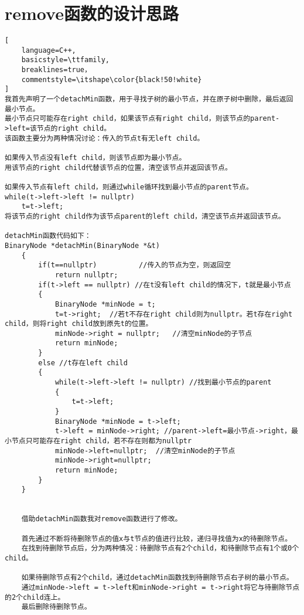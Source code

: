 \documentclass[UTF8]{ctexart}
\begin{document}
\pagestyle{fancy}
\fancyhead{}

\section{remove函数的设计思路}
\begin{lstlisting}[
    language=C++,
    basicstyle=\ttfamily,
    breaklines=true，
    commentstyle=\itshape\color{black!50!white}
]
我首先声明了一个detachMin函数，用于寻找子树的最小节点，并在原子树中删除，最后返回最小节点。
最小节点只可能存在right child，如果该节点有right child，则该节点的parent->left=该节点的right child。
该函数主要分为两种情况讨论：传入的节点t有无left child。

如果传入节点没有left child，则该节点即为最小节点。
用该节点的right child代替该节点的位置，清空该节点并返回该节点。

如果传入节点有left child，则通过while循环找到最小节点的parent节点。
while(t->left->left != nullptr) 
    t=t->left;
将该节点的right child作为该节点parent的left child，清空该节点并返回该节点。

detachMin函数代码如下：
BinaryNode *detachMin(BinaryNode *&t)
    {
        if(t==nullptr)          //传入的节点为空，则返回空
            return nullptr;
        if(t->left == nullptr) //在t没有left child的情况下，t就是最小节点
        {
            BinaryNode *minNode = t;
            t=t->right;  //若t不存在right child则为nullptr。若t存在right child，则将right child放到原先t的位置。
            minNode->right = nullptr;   //清空minNode的子节点
            return minNode;
        }
        else //t存在left child
        {
            while(t->left->left != nullptr) //找到最小节点的parent
            {
                t=t->left;
            }
            BinaryNode *minNode = t->left;
            t->left = minNode->right; //parent->left=最小节点->right，最小节点只可能存在right child，若不存在则都为nullptr
            minNode->left=nullptr;  //清空minNode的子节点
            minNode->right=nullptr;
            return minNode;
        }
    }


    借助detachMin函数我对remove函数进行了修改。
    
    首先通过不断将待删除节点的值x与t节点的值进行比较，递归寻找值为x的待删除节点。
    在找到待删除节点后，分为两种情况：待删除节点有2个child，和待删除节点有1个或0个child。
    
    如果待删除节点有2个child，通过detachMin函数找到待删除节点右子树的最小节点。
    通过minNode->left = t->left和minNode->right = t->right将它与待删除节点的2个child连上。
    最后删除待删除节点。
    

\end{lstlisting}
\end{document}
